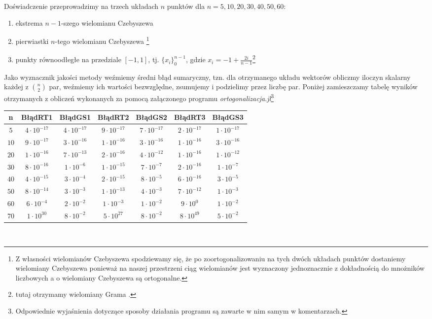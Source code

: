 \documentclass[12pt,wide]{mwart}
\begin{document}
Doświadczenie przeprowadzimy na trzech układach $n$ punktów dla $n = 5,10,20,30,40,50,60$:
\begin{enumerate}
    \item ekstrema $n-1$-szego wielomianu Czebyszewa
    \item pierwiastki $n$-tego wielomianu Czebyszewa \footnote{Z własności wielomianów Czebyszewa spodziewamy się, że po zoortogonalizowaniu na tych dwóch układach punktów dostaniemy wielomiany Czebyszewa ponieważ na naszej przestrzeni ciąg wielomianów jest wyznaczony jednoznacznie z dokładnością do mnożników liczbowych a o wielomiany Czebyszewa są ortogonalne.}
    \item punkty równoodłegłe na przedziale $[-1,1]$, tj. $\{x_i\}_0^{n-1}$, gdzie $x_i = -1 + \frac{2i}{n-1}$\footnote{tutaj otrzymamy wielomiany Grama \cite[strona 97]{JMJ}.}\\
\end{enumerate}    
Jako wyznacznik jakości metody weźmiemy średni błąd sumaryczny, tzn. dla otrzymanego układu wektorów obliczmy iloczyn skalarny każdej z ${n \choose 2}$ par, weźmiemy ich wartości bezwzględne, zsumujemy i podzielimy przez liczbę par. Poniżej zamieszczamy tabelę wyników otrzymanych z obliczeń wykonanych za pomocą załączonego programu \textit{ortogonalizacja.jl}\footnote{Odpowiednie wyjaśnienia dotyczące sposoby działania programu są zawarte w nim samym w komentarzach.}\\

 \begin{tabular}{|c|c|c|c|c|c|c|}
 \hline 
 n & BłądRT1 & BłądGS1 & BłądRT2 & BłądGS2 & BłądRT3 & BłądGS3 \\ 
 \hline 
 $5$ & $4\cdot 10^{-17}$ & $4\cdot 10^{-17}$ & $9\cdot 10^{-17}$ & $7\cdot 10^{-17}$ & $2\cdot 10^{-17}$ & $1\cdot 10^{-17}$ \\ 
 \hline 
 $10$ & $9\cdot 10^{-17}$ & $3\cdot 10^{-16}$ & $1\cdot 10^{-16}$ & $3\cdot 10^{-16}$ & $1\cdot 10^{-16}$ & $3\cdot 10^{-16}$ \\ 
 \hline 
 $20$ & $1\cdot 10^{-16}$ & $7\cdot 10^{-13}$ & $2\cdot 10^{-16}$ & $4\cdot 10^{-12}$ & $1\cdot 10^{-16}$ & $1\cdot 10^{-12}$ \\ 
 \hline 
 $30$ & $8\cdot 10^{-16}$ & $1\cdot 10^{-6}$ & $1\cdot 10^{-15}$ & $7\cdot 10^{-7}$ & $2\cdot 10^{-16}$ & $1\cdot 10^{-7}$ \\ 
 \hline 
 $40$ & $4\cdot 10^{-15}$ & $3\cdot 10^{-4}$ & $2\cdot 10^{-15}$ & $8\cdot 10^{-5}$ & $6\cdot 10^{-16}$ & $3\cdot 10^{-5}$ \\ 
 \hline 
 $50$ & $8\cdot 10^{-14}$ & $3\cdot 10^{-3}$ & $1\cdot 10^{-13}$ &$4\cdot 10^{-3}$ & $7\cdot 10^{-12}$ & $1\cdot 10^{-3}$ \\ 
 \hline 
 $60$ & $6\cdot 10^{-4}$ & $2\cdot 10^{-2}$ & $1\cdot 10^{-3}$ & $1\cdot 10^{-2}$ & $9\cdot 10^{0}$ & $1\cdot 10^{-2}$ \\ 
 \hline 
 $70$ & $1\cdot 10^{30}$ & $8\cdot 10^{-2}$ & $5\cdot 10^{27}$ & $8\cdot 10^{-2}$ & $8\cdot 10^{49}$ & $5\cdot 10^{-2}$ \\ 
 \hline 
 \end{tabular}\\
 
\end{document}
